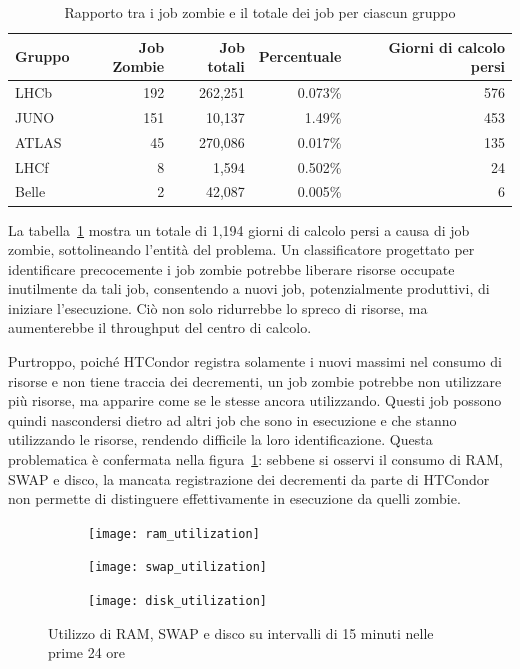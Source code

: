 \begin{table}[!ht]
    \centering
    \caption{Rapporto tra i job zombie e il totale dei job per ciascun gruppo}
    \begin{tabular}{lrrrr}
        \toprule
        \textbf{Gruppo} & \textbf{Job Zombie} & \textbf{Job totali} &
        \textbf{Percentuale} & \textbf{Giorni di calcolo persi} \\
        \midrule
        LHCb & 192 & 262,251 & 0.073\% & 576 \\
        JUNO & 151 & 10,137 & 1.49\% & 453 \\
        ATLAS & 45 & 270,086 & 0.017\% & 135 \\
        LHCf & 8 & 1,594 & 0.502\% & 24 \\
        Belle & 2 & 42,087 & 0.005\% & 6 \\
        \bottomrule
    \end{tabular}
    \label{table:job_zombie_timelost}
\end{table}

La tabella~\ref{table:job_zombie_timelost} mostra un totale di 1,194 giorni di
calcolo persi a causa di job zombie, sottolineando l'entità del problema. Un
classificatore progettato per identificare precocemente i job zombie potrebbe
liberare risorse occupate inutilmente da tali job, consentendo a nuovi job,
potenzialmente produttivi, di iniziare l'esecuzione. Ciò non solo ridurrebbe
lo spreco di risorse, ma aumenterebbe il throughput del centro di calcolo.

Purtroppo, poiché HTCondor registra solamente i nuovi massimi nel consumo di
risorse e non tiene traccia dei decrementi, un job zombie potrebbe non
utilizzare più risorse, ma apparire come se le stesse ancora utilizzando.
Questi job possono quindi nascondersi dietro ad altri job che sono in
esecuzione e che stanno utilizzando le risorse, rendendo difficile la loro
identificazione. Questa problematica è confermata nella
figura~\ref{fig:resources_utilization_firstday}: sebbene si osservi il consumo
di RAM, SWAP e disco, la mancata registrazione dei decrementi da parte di
HTCondor non permette di distinguere effettivamente in esecuzione da quelli
zombie.

\begin{figure}[p]
    \centering
    \begin{subfigure}[t]{0.8\linewidth}
        \texttt{[image: ram\_utilization]}
    \end{subfigure}
    \vfill
    \begin{subfigure}[t]{0.8\linewidth}
        \texttt{[image: swap\_utilization]}
    \end{subfigure}
    \vfill
    \begin{subfigure}[t]{0.8\linewidth}
        \texttt{[image: disk\_utilization]}
    \end{subfigure}
    \caption{Utilizzo di RAM, SWAP e disco su intervalli di 15 minuti nelle
    prime 24 ore}
    \label{fig:resources_utilization_firstday}
\end{figure}

